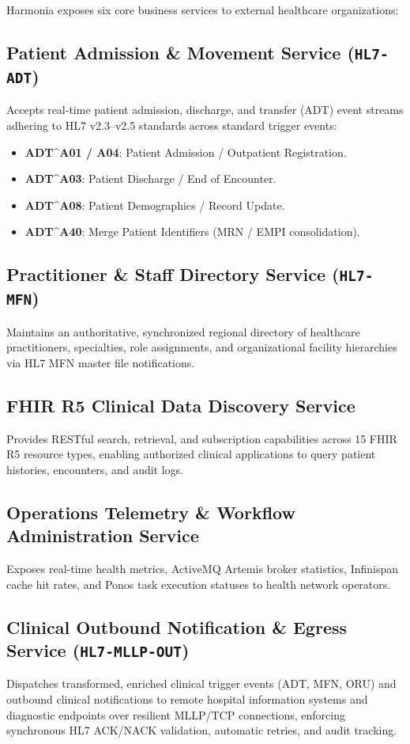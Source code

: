 Harmonia exposes six core business services to external healthcare organizations:

\subsection{Patient Admission \& Movement Service (\texttt{HL7-ADT})}
Accepts real-time patient admission, discharge, and transfer (ADT) event streams adhering to HL7 v2.3--v2.5 standards across standard trigger events:
\begin{itemize}
    \item \textbf{ADT\^{}A01 / A04}: Patient Admission / Outpatient Registration.
    \item \textbf{ADT\^{}A03}: Patient Discharge / End of Encounter.
    \item \textbf{ADT\^{}A08}: Patient Demographics / Record Update.
    \item \textbf{ADT\^{}A40}: Merge Patient Identifiers (MRN / EMPI consolidation).
\end{itemize}

\subsection{Practitioner \& Staff Directory Service (\texttt{HL7-MFN})}
Maintains an authoritative, synchronized regional directory of healthcare practitioners, specialties, role assignments, and organizational facility hierarchies via HL7 MFN master file notifications.

\subsection{FHIR R5 Clinical Data Discovery Service}
Provides RESTful search, retrieval, and subscription capabilities across 15 FHIR R5 resource types, enabling authorized clinical applications to query patient histories, encounters, and audit logs.

\subsection{Operations Telemetry \& Workflow Administration Service}
Exposes real-time health metrics, ActiveMQ Artemis broker statistics, Infinispan cache hit rates, and Ponos task execution statuses to health network operators.

\subsection{Clinical Outbound Notification \& Egress Service (\texttt{HL7-MLLP-OUT})}
Dispatches transformed, enriched clinical trigger events (ADT, MFN, ORU) and outbound clinical notifications to remote hospital information systems and diagnostic endpoints over resilient MLLP/TCP connections, enforcing synchronous HL7 ACK/NACK validation, automatic retries, and audit tracking.

